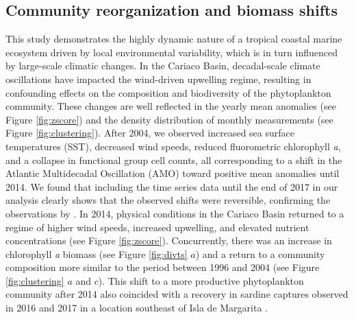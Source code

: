 \documentclass[draft]{agujournal2019}
\begin{document}
\subsection{Community reorganization and biomass shifts}
This study demonstrates the highly dynamic nature of a tropical coastal marine ecosystem driven by local environmental variability, which is in turn influenced by large-scale climatic changes. In the Cariaco Basin, decadal-scale climate oscillations have impacted the wind-driven upwelling regime, resulting in confounding effects on the composition and biodiversity of the phytoplankton community.
These changes are well reflected in the yearly mean anomalies (see Figure \ref{fig:zscore}) and the density distribution of monthly measurements (see Figure \ref{fig:clustering}). After 2004, we observed increased sea surface temperatures (SST), decreased wind speeds, reduced fluorometric chlorophyll \textit{a}, and a collapse in functional group cell counts, all corresponding to a shift in the Atlantic Multidecadal Oscillation (AMO) toward positive mean anomalies until 2014. 
We found that including the time series data until the end of 2017 in our analysis clearly shows that the observed shifts were reversible, confirming the observations by . In 2014, physical conditions in the Cariaco Basin returned to a regime of higher wind speeds, increased upwelling, and elevated nutrient concentrations (see Figure \ref{fig:zscore}). Concurrently, there was an increase in chlorophyll \textit{a} biomass (see Figure \ref{fig:divts} $a$) and a return to a community composition more similar to the period between 1996 and 2004 (see Figure \ref{fig:clustering} $a$ and $c$). This shift to a more productive phytoplankton community after 2014 also coincided with a recovery in sardine captures observed in 2016 and 2017 in a location southeast of Isla de Margarita \cite{gomez_gaspar_variacion_2025}.
\end{document}

